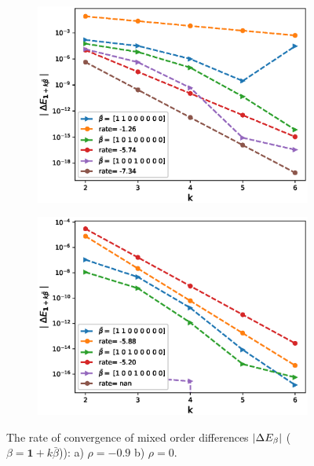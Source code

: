 \documentclass[11pt]{article}
\begin{document}
\begin{figure}[h!]
\centering
\begin{subfigure}{.5\textwidth}
\centering
\includegraphics[width=1\linewidth]{./figures/effect_rho_differences/H_0_43_K_1/N_4/mixed_difference_order2_rbergomi_4steps_H_043_K_1_rho__0__9_with_rate_W1}
\caption{}
\label{fig:sub3}
\end{subfigure}%
\begin{subfigure}{.5\textwidth}
\centering
\includegraphics[width=1\linewidth]{./figures/effect_rho_differences/H_0_43_K_1/N_4/mixed_difference_order2_rbergomi_4steps_H_043_K_1_rho_0_with_rate_W1}
\caption{}
\label{fig:sub4}
\end{subfigure}

\caption{The rate of convergence of  mixed order differences $\left\lvert\Delta E_{\beta}\right\rvert$ ($\beta=\mathbf{1}+k \bar{\beta}$)): a) $\rho=-0.9$ b)  $\rho=0.$}
\label{fig:test2}
\end{figure}
\end{document}
